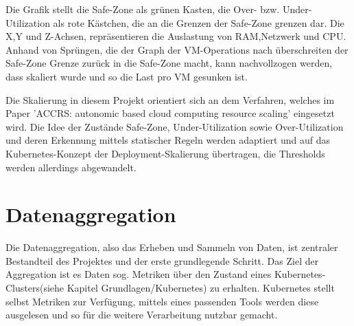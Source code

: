 \documentclass[a4paper,12pt]{scrartcl}
\begin{document}
Die Grafik stellt die Safe-Zone als grünen Kasten, die Over- bzw. Under-Utilization als rote Kästchen, die an die Grenzen der Safe-Zone grenzen dar. Die X,Y und Z-Achsen, repräsentieren die Auslastung von RAM,Netzwerk und CPU. Anhand von Sprüngen, die der Graph der VM-Operations nach überschreiten der Safe-Zone Grenze zurück in die Safe-Zone macht, kann nachvollzogen werden, dass skaliert wurde und so die Last pro VM gesunken ist.

Die Skalierung in diesem Projekt orientiert sich an dem Verfahren, welches im Paper 'ACCRS: autonomic based cloud computing resource scaling' eingesetzt wird. Die Idee der Zustände Safe-Zone, Under-Utilization sowie Over-Utilization und deren Erkennung mittels statischer Regeln werden adaptiert und auf das Kubernetes-Konzept der Deployment-Skalierung übertragen, die Thresholds werden allerdings abgewandelt. 








\section{Datenaggregation}

Die Datenaggregation, also das Erheben und Sammeln von Daten, ist zentraler Bestandteil des Projektes und der erste grundlegende Schritt. Das Ziel der Aggregation ist es Daten sog. Metriken über den Zustand eines Kubernetes-Clusters(siehe Kapitel Grundlagen/Kubernetes) zu erhalten. Kubernetes stellt selbst Metriken zur Verfügung, mittels eines passenden Tools werden diese ausgelesen und so für die weitere Verarbeitung nutzbar gemacht.
\end{document}
